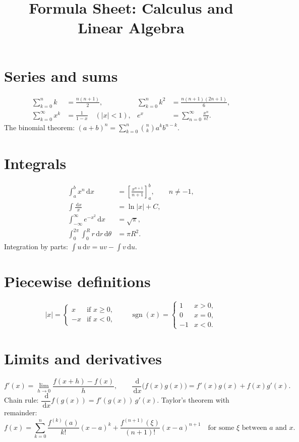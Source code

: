 \documentclass[11pt]{article}
\title{Formula Sheet: Calculus and Linear Algebra}
\author{}
\date{}
\newcommand{\dd}{\,\mathrm{d}}
\begin{document}
\maketitle
\thispagestyle{empty}

\section*{Series and sums}
\begin{align}
  \sum_{k=0}^{n} k &= \frac{n(n+1)}{2}, &
  \sum_{k=0}^{n} k^2 &= \frac{n(n+1)(2n+1)}{6}, \\
  \sum_{k=0}^{\infty} x^k &= \frac{1}{1-x} \quad (|x|<1), &
  e^x &= \sum_{n=0}^{\infty} \frac{x^n}{n!}.
\end{align}
The binomial theorem: $(a+b)^n = \sum_{k=0}^{n} \binom{n}{k} a^{k} b^{n-k}$.

\section*{Integrals}
\begin{align*}
  \int_a^b x^n \dd x &= \left[ \frac{x^{n+1}}{n+1} \right]_a^b, \qquad n \ne -1, \\
  \int \frac{\dd x}{x} &= \ln|x| + C, \\
  \int_{-\infty}^{\infty} e^{-x^2} \dd x &= \sqrt{\pi}, \\
  \int_0^{2\pi} \!\! \int_0^{R} r \dd r \dd\theta &= \pi R^2 .
\end{align*}
Integration by parts: $\displaystyle \int u \dd v = uv - \int v \dd u$.

\section*{Piecewise definitions}
\[
  |x| = \begin{cases}
    x  & \text{if } x \ge 0, \\
    -x & \text{if } x < 0,
  \end{cases}
  \qquad
  \operatorname{sgn}(x) = \begin{cases}
    1 & x > 0, \\
    0 & x = 0, \\
    -1 & x < 0.
  \end{cases}
\]

\section*{Limits and derivatives}
\[
  f'(x) = \lim_{h \to 0} \frac{f(x+h) - f(x)}{h}, \qquad
  \frac{\dd}{\dd x}\bigl( f(x) g(x) \bigr) = f'(x) g(x) + f(x) g'(x).
\]
Chain rule: $\dfrac{\dd}{\dd x} f(g(x)) = f'(g(x))\, g'(x)$.
Taylor's theorem with remainder:
\begin{equation}
  f(x) = \sum_{k=0}^{n} \frac{f^{(k)}(a)}{k!}(x-a)^k + \frac{f^{(n+1)}(\xi)}{(n+1)!}(x-a)^{n+1}
  \quad \text{for some } \xi \text{ between } a \text{ and } x.
\end{equation}
\end{document}
